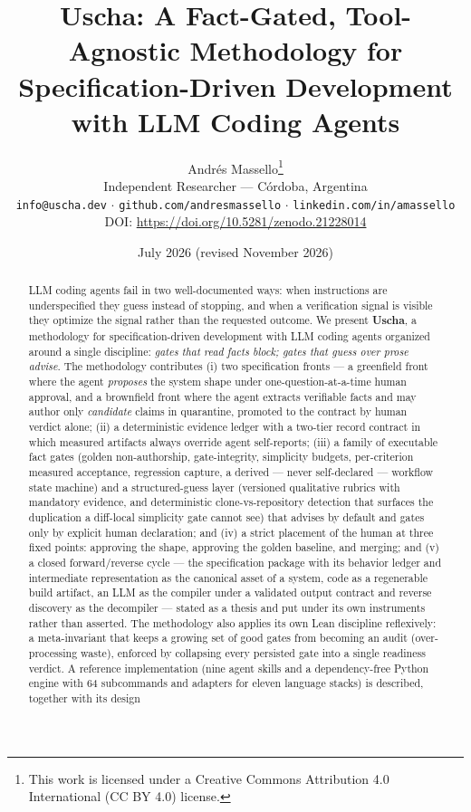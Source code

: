 \documentclass[11pt]{article}
\title{\textbf{Uscha: A Fact-Gated, Tool-Agnostic Methodology for\\Specification-Driven Development with LLM Coding Agents}}
\author{Andr\'es Massello\thanks{This work is licensed under a Creative
Commons Attribution 4.0 International (CC BY 4.0) license.}\\
\small Independent Researcher --- C\'ordoba, Argentina\\
\small \texttt{info@uscha.dev} $\cdot$ \texttt{github.com/andresmassello}
$\cdot$ \texttt{linkedin.com/in/amassello}\\
\small DOI: \url{https://doi.org/10.5281/zenodo.21228014}}
\date{July 2026 (revised November 2026)}
\begin{document}
\maketitle

\begin{abstract}
LLM coding agents fail in two well-documented ways: when instructions are
underspecified they guess instead of stopping, and when a verification signal is
visible they optimize the signal rather than the requested outcome. We present
\textbf{Uscha}, a methodology for specification-driven development with LLM
coding agents organized around a single discipline: \emph{gates that read facts
block; gates that guess over prose advise}. The methodology contributes (i) two
specification fronts --- a greenfield front where the agent \emph{proposes} the
system shape under one-question-at-a-time human approval, and a brownfield front
where the agent extracts verifiable facts and may author only \emph{candidate}
claims in quarantine, promoted to the contract by human verdict alone; (ii) a deterministic evidence ledger with a
two-tier record contract in which measured artifacts always override agent
self-reports; (iii) a family of executable fact gates (golden non-authorship,
gate-integrity, simplicity budgets, per-criterion measured acceptance,
regression capture, a derived --- never self-declared --- workflow state machine)
and a structured-guess layer (versioned qualitative rubrics with mandatory
evidence, and deterministic clone-vs-repository detection that surfaces the
duplication a diff-local simplicity gate cannot see) that advises by default and
gates only by explicit human declaration; and (iv) a strict placement of the
human at three fixed points: approving the shape, approving the golden baseline,
and merging; and (v) a closed forward/reverse cycle --- the specification package
with its behavior ledger and intermediate representation as the canonical asset of
a system, code as a regenerable build artifact, an LLM as the compiler under a
validated output contract and reverse discovery as the decompiler --- stated as a
thesis and put under its own instruments rather than asserted. The methodology also applies its own Lean discipline reflexively:
a meta-invariant that keeps a growing set of good gates from becoming an audit
(over-processing waste), enforced by collapsing every persisted gate into a
single readiness verdict. A reference implementation (nine agent skills and a
dependency-free Python engine with 64 subcommands and adapters for eleven language
stacks) is described, together with its design

\end{abstract}
\end{document}

